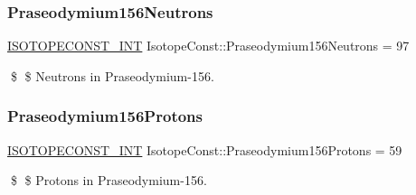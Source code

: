 \subsubsection{\texorpdfstring{Praseodymium156\+Neutrons}{Praseodymium156Neutrons}}
{\footnotesize\ttfamily \mbox{\hyperlink{group___isotope_const-_macros_ga5f18360b3e99483a35c32d789e62621c}{I\+S\+O\+T\+O\+P\+E\+C\+O\+N\+S\+T\+\_\+\+I\+NT}} Isotope\+Const\+::\+Praseodymium156\+Neutrons = 97}

\$ \$ Neutrons in Praseodymium-\/156. \mbox{\label{group___isotope_const-_praseodymium-_pr156_gafc70dcdd6a9e8635b71c9db45d7d4d27}} 
\subsubsection{\texorpdfstring{Praseodymium156\+Protons}{Praseodymium156Protons}}
{\footnotesize\ttfamily \mbox{\hyperlink{group___isotope_const-_macros_ga5f18360b3e99483a35c32d789e62621c}{I\+S\+O\+T\+O\+P\+E\+C\+O\+N\+S\+T\+\_\+\+I\+NT}} Isotope\+Const\+::\+Praseodymium156\+Protons = 59}

\$ \$ Protons in Praseodymium-\/156. 